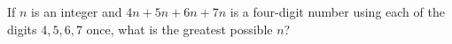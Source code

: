 If $n$ is an integer and $4n+5n+6n+7n$ is a four-digit number using each of the digits $4,5,6,7$ once, what is the greatest possible $n$?
